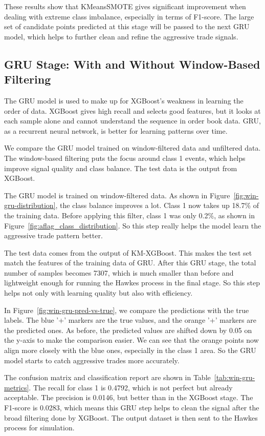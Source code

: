 These results show that KMeansSMOTE gives significant improvement when dealing with extreme class imbalance, especially in terms of F1-score. The large set of candidate points predicted at this stage will be passed to the next GRU model, which helps to further clean and refine the aggressive trade signals.

\subsection{GRU Stage: With and Without Window-Based Filtering}
The GRU model is used to make up for XGBoost's weakness in learning the order of data. XGBoost gives high recall and selects good features, but it looks at each sample alone and cannot understand the sequence in order book data. GRU, as a recurrent neural network, is better for learning patterns over time.

We compare the GRU model trained on window-filtered data and unfiltered data. The window-based filtering puts the focus around class 1 events, which helps improve signal quality and class balance. The test data is the output from XGBoost.

The GRU model is trained on window-filtered data. As shown in Figure~\ref{fig:win-gru-distribution}, the class balance improves a lot. Class 1 now takes up 18.7\% of the training data. Before applying this filter, class 1 was only 0.2\%, as shown in Figure~\ref{fig:aflag_class_distribution}. So this step really helps the model learn the aggressive trade pattern better. 

The test data comes from the output of KM-XGBoost. This makes the test set match the features of the training data of GRU. After this GRU stage, the total number of samples becomes 7307, which is much smaller than before and lightweight enough for running the Hawkes process in the final stage. So this step helps not only with learning quality but also with efficiency.

In Figure~\ref{fig:win-gru-pred-vs-true}, we compare the predictions with the true labels. The blue '+' markers are the true values, and the orange '+' markers are the predicted ones. As before, the predicted values are shifted down by 0.05 on the y-axis to make the comparison easier. We can see that the orange points now align more closely with the blue ones, especially in the class 1 area. So the GRU model starts to catch aggressive trades more accurately.

The confusion matrix and classification report are shown in Table~\ref{tab:win-gru-metrics}. The recall for class 1 is 0.4792, which is not perfect but already acceptable. The precision is 0.0146, but better than in the XGBoost stage. The F1-score is 0.0283, which means this GRU step helps to clean the signal after the broad filtering done by XGBoost. The output dataset is then sent to the Hawkes process for simulation.

